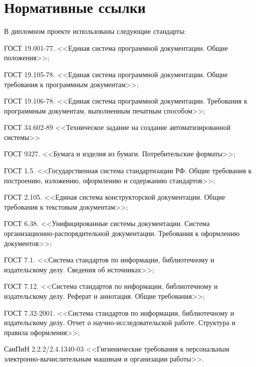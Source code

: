 \newpage
\section*{Нормативные ссылки}
В дипломном проекте использованы следующие стандарты:

ГОСТ 19.001-77. <<Единая система программной документации. Общие положения>>;

ГОСТ 19.105-78. <<Единая система программной документации. Общие требования к программным документам>>;

ГОСТ 19.106-78. <<Единая система программной документации. Требования к программным документам, выполненным печатным способом>>;

ГОСТ 34.602-89 <<Техническое задание на создание автоматизированной системы>>

ГОСТ 9327. <<Бумага и изделия из бумаги. Потребительские форматы>>;

ГОСТ 1.5. <<Государственная система стандартизации РФ. Общие требования к построению, изложению, оформлению и содержанию стандартов>>;

ГОСТ 2.105. <<Единая система конструкторской документации. Общие требования к текстовым документам>>;

ГОСТ 6.38. <<Унифицированные системы документации. Система организационно-распорядительной документации. Требования к оформлению документов>>;

ГОСТ 7.1. <<Система стандартов по информации, библиотечному и издательскому делу. Сведения об источниках>>;

ГОСТ 7.12. <<Система стандартов по информации, библиотечному и издательскому делу. Реферат и аннотация. Общие требования>>;

ГОСТ 7.32-2001. <<Система стандартов по информации, библиотечному и издательскому делу. Отчет о научно-исследовательской работе. Структура и правила оформления>>;

СанПиН 2.2.2/2.4.1340-03 <<Гигиенические требования к персональным электронно-вычислительным машинам и организации работы>>.
